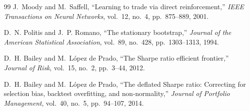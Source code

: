 \documentclass[12pt,a4paper,oneside]{book}
\begin{document}
\begin{thebibliography}{99}
J.~Moody and M.~Saffell, ``Learning to trade via direct reinforcement,'' \emph{IEEE Transactions on Neural Networks}, vol.~12, no.~4, pp.~875--889, 2001.

D.~N. Politis and J.~P. Romano, ``The stationary bootstrap,'' \emph{Journal of the American Statistical Association}, vol.~89, no.~428, pp.~1303--1313, 1994.

D.~H. Bailey and M.~L{\'o}pez de Prado, ``The Sharpe ratio efficient frontier,'' \emph{Journal of Risk}, vol.~15, no.~2, pp.~3--44, 2012.

D.~H. Bailey and M.~L{\'o}pez de Prado, ``The deflated Sharpe ratio: Correcting for selection bias, backtest overfitting, and non-normality,'' \emph{Journal of Portfolio Management}, vol.~40, no.~5, pp.~94--107, 2014.
\end{thebibliography}
\end{document}

